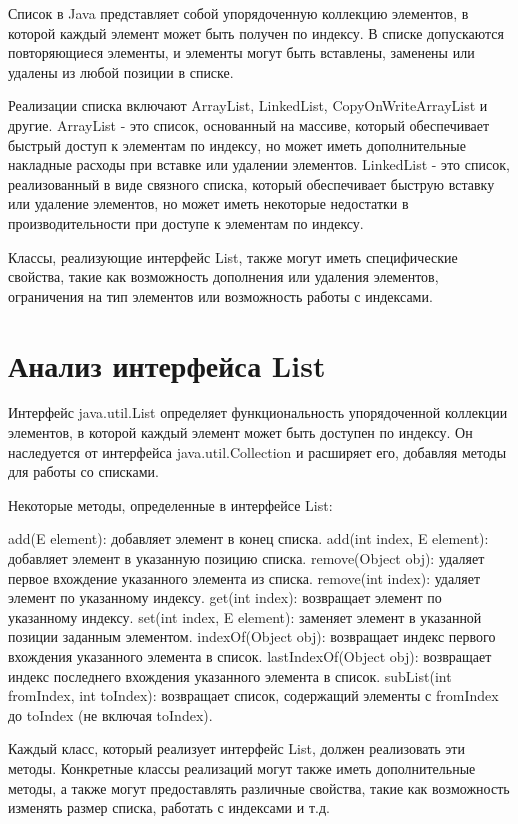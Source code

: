 Список в Java представляет собой упорядоченную коллекцию элементов, в которой каждый элемент может быть получен по индексу. В списке допускаются повторяющиеся элементы, и элементы могут быть вставлены, заменены или удалены из любой позиции в списке.

Реализации списка включают ArrayList, LinkedList, \newline CopyOnWriteArrayList и другие. ArrayList - это список, основанный на массиве, который обеспечивает быстрый доступ к элементам по индексу, но может иметь дополнительные накладные расходы при вставке или удалении элементов. LinkedList - это список, реализованный в виде связного списка, который обеспечивает быструю вставку или удаление элементов, но может иметь некоторые недостатки в производительности при доступе к элементам по индексу.

Классы, реализующие интерфейс List, также могут иметь специфические свойства, такие как возможность дополнения или удаления элементов, ограничения на тип элементов или возможность работы с индексами.

\section{Анализ интерфейса List}
Интерфейс java.util.List определяет функциональность упорядоченной коллекции элементов, в которой каждый элемент может быть доступен по индексу. Он наследуется от интерфейса java.util.Collection и расширяет его, добавляя методы для работы со списками.

Некоторые методы, определенные в интерфейсе List:

    add(E element): добавляет элемент в конец списка.
    add(int index, E element): добавляет элемент в указанную позицию списка.
    remove(Object obj): удаляет первое вхождение указанного элемента из списка.
    remove(int index): удаляет элемент по указанному индексу.
    get(int index): возвращает элемент по указанному индексу.
    set(int index, E element): заменяет элемент в указанной позиции заданным элементом.
    indexOf(Object obj): возвращает индекс первого вхождения указанного элемента в список.
    lastIndexOf(Object obj): возвращает индекс последнего вхождения указанного элемента в список.
    subList(int fromIndex, int toIndex): возвращает список, содержащий элементы с fromIndex до toIndex (не включая toIndex).

Каждый класс, который реализует интерфейс List, должен реализовать эти методы. Конкретные классы реализаций могут также иметь дополнительные методы, а также могут предоставлять различные свойства, такие как возможность изменять размер списка, работать с индексами и т.д.

